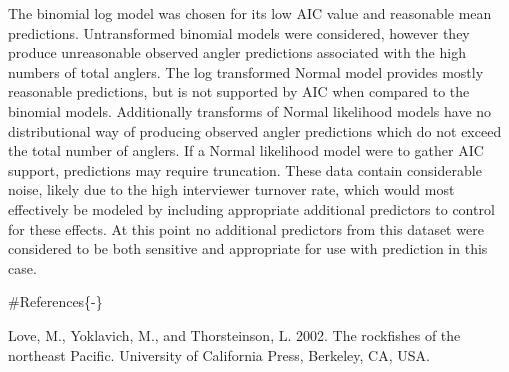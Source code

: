 \documentclass[12pt,]{article}
\begin{document}
The binomial log model was chosen for its low AIC value and reasonable
mean predictions. Untransformed binomial models were considered, however
they produce unreasonable observed angler predictions associated with
the high numbers of total anglers. The log transformed Normal model
provides mostly reasonable predictions, but is not supported by AIC when
compared to the binomial models. Additionally transforms of Normal
likelihood models have no distributional way of producing observed
angler predictions which do not exceed the total number of anglers. If a
Normal likelihood model were to gather AIC support, predictions may
require truncation. These data contain considerable noise, likely due to
the high interviewer turnover rate, which would most effectively be
modeled by including appropriate additional predictors to control for
these effects. At this point no additional predictors from this dataset
were considered to be both sensitive and appropriate for use with
prediction in this case.

\newpage

\thispagestyle{empty} \#References\{-\}

Love, M., Yoklavich, M., and Thorsteinson, L. 2002. The rockfishes of
the northeast Pacific. University of California Press, Berkeley, CA,
USA.
\end{document}
